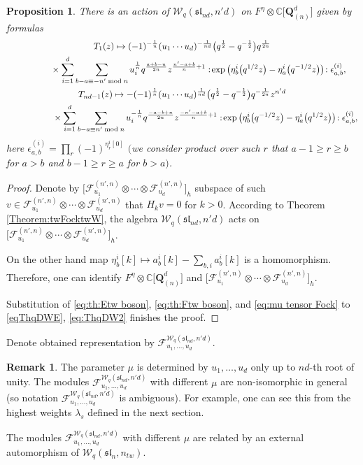 \documentclass[pdftex]{sigma}
\numberwithin{equation}{section}
\newtheorem{Proposition}[Theorem]{Proposition}
\theoremstyle{definition}
\newtheorem{Remark}[Theorem]{Remark}
\newcommand{\half}{\frac{1}{2}}
\newcommand{ \twW }{ \mathcal{W}_{q} ( \mathfrak{sl}_n, n_{tw} ) }
\newcommand{\dQ}{\mathbf{Q}^d_{(n)}}
\newcommand{\dWFock}{\mathcal{F}^{\mathcal{W}_{q} ( \mathfrak{sl}_{nd}, n'd )}_{u_1, \dots, u_d}}
\begin{document}
\begin{Proposition} \label{prop:W bosonization}
There is an action of $\mathcal{W}_q (\mathfrak{sl}_{nd}, n'd)$
on $F^{\eta} \otimes \mathbb{C} \big[ \dQ \big]$ given by formulas
\begin{gather*} %
T_1 (z) \mapsto (-1)^{-\frac{1}{n}} (u_1 \cdots u_d)^{-\frac{1}{nd}}\big(q^{\half}-q^{-\half}\big) q^{\frac{1}{2n}} \\
\hphantom{T_1 (z) \mapsto}{}
\times\sum_{i=1}^d \sum_{b-a \equiv -n' \bmod n}u_i^{\frac{1}{n}} q^{\frac{a+b-n}{2n}} z^{\frac{n'-a+b}{n}+1} : \! \exp \big( \eta^i_b\big(q^{1/2} z\big) - \eta^i_a\big(q^{-1/2} z\big) \big) \! : \epsilon_{a,b}^{(i)},
\\
T_{nd-1}(z) \mapsto - (-1)^{\frac{1}{n}} (u_1 \cdots u_d)^{\frac{1}{nd}} \big(q^{\half}-q^{-\half}\big) q^{-\frac{1}{2n}} z^{n'd} \\ \hphantom{T_{nd-1}(z) \mapsto}{}\times \sum_{i=1}^d \sum_{b-a \equiv n' \bmod n} u_i^{-\frac{1}{n}} q^{ \frac{-a-b+n}{2n} } z^{\frac{-n'-a+b}{n}+1} : \! \exp \big( \eta^i_b\big(q^{-1/2} z\big) - \eta^i_a\big(q^{1/2} z\big) \big) \! : \epsilon_{a,b}^{(i)},
\end{gather*}
here $\epsilon_{a,b}^{(i)} = \prod_{r} (-1)^{\eta_r^i[0]}$ $($we consider product over such $r$ that $a-1 \geqslant r \geqslant b$ for $a>b$ and $b-1 \geqslant r \geqslant a$ for $b>a)$.
\end{Proposition}

\begin{proof}
Denote by $\big[ \mathcal{F}^{(n',n)}_{u_1} \otimes \cdots \otimes \mathcal{F}_{u_d}^{(n',n)} \big]_{h}$ subspace of such $ v \in \mathcal{F}^{(n',n)}_{u_1} \otimes \cdots \otimes \mathcal{F}_{u_d}^{(n',n)}$ that $H_k v=0$ for $k>0$. According to Theorem \ref{Theorem:twFocktwW}, the algebra $\mathcal{W}_q (\mathfrak{sl}_{nd}, n'd)$ acts on $\big[ \mathcal{F}^{(n',n)}_{u_1} \otimes \cdots \allowbreak \otimes \mathcal{F}_{u_d}^{(n',n)} \big]_{h}$.

On the other hand map $\eta_b^i[k] \mapsto a_b^i[k] - \sum_{b,i} a_b^i[k]$ is a homomorphism.
Therefore, one can identify $F^{\eta} \otimes \mathbb{C} \big[ \dQ \big]$ and $\big[ \mathcal{F}^{(n',n)}_{u_1} \otimes \cdots \otimes \mathcal{F}_{u_d}^{(n',n)} \big]_{h}$.

Substitution of \eqref{eq:th:Etw boson}, \eqref{eq:th:Ftw boson}, and \eqref{eq:mu tensor Fock} to \eqref{eqThqDWE}, \eqref{eq:ThqDW2} finishes the proof.
\end{proof}
Denote obtained representation by $\dWFock$.
\begin{Remark} \label{remark mu abuse}
The parameter $\mu$ is determined by $u_1,\dots, u_d$ only up to $nd$-th root of unity. The modules $\dWFock$ with different $\mu$ are non-isomorphic in general (so notation $\dWFock$ is ambiguous). For example, one can see this from the highest weights $\lambda_s$ defined in the next section.

The modules $\dWFock$ with different $\mu$ are related by an external automorphism of $\twW$.
\end{Remark}
\end{document}
